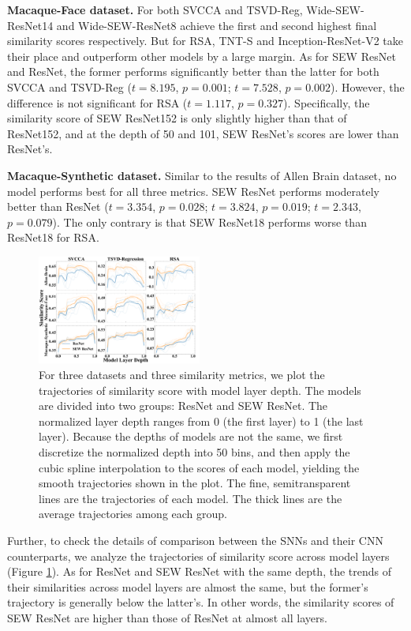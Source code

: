 \documentclass[letterpaper]{article} %
\begin{document}
\textbf{Macaque-Face dataset.} For both SVCCA and TSVD-Reg, Wide-SEW-ResNet14 and Wide-SEW-ResNet8 achieve the first and second highest final similarity scores respectively. But for RSA, TNT-S and Inception-ResNet-V2 take their place and outperform other models by a large margin. As for SEW ResNet and ResNet, the former performs significantly better than the latter for both SVCCA and TSVD-Reg ($t=8.195$, $p=0.001$; $t=7.528$, $p=0.002$). However, the difference is not significant for RSA ($t=1.117$, $p=0.327$). Specifically, the similarity score of SEW ResNet152 is only slightly higher than that of ResNet152, and at the depth of 50 and 101, SEW ResNet's scores are lower than ResNet's.

\textbf{Macaque-Synthetic dataset.} Similar to the results of Allen Brain dataset, no model performs best for all three metrics. SEW ResNet performs moderately better than ResNet ($t=3.354$, $p=0.028$; $t=3.824$, $p=0.019$; $t=2.343$, $p=0.079$). The only contrary is that SEW ResNet18 performs worse than ResNet18 for RSA.

\begin{figure}[t]
\centering
\includegraphics[width=0.48\textwidth]{figs/resnet_trajectory_compare.pdf}
\caption{For three datasets and three similarity metrics, we plot the trajectories of similarity score with model layer depth. The models are divided into two groups: ResNet and SEW ResNet. The normalized layer depth ranges from 0 (the first layer) to 1 (the last layer). Because the depths of models are not the same, we first discretize the normalized depth into 50 bins, and then apply the cubic spline interpolation to the scores of each model, yielding the smooth trajectories shown in the plot. The fine, semitransparent lines are the trajectories of each model. The thick lines are the average trajectories among each group.}
\label{Fig.resnet_trajectory_compare}
\end{figure}

Further, to check the details of comparison between the SNNs and their CNN counterparts, we analyze the trajectories of similarity score across model layers (Figure \ref{Fig.resnet_trajectory_compare}). As for ResNet and SEW ResNet with the same depth, the trends of their similarities across model layers are almost the same, but the former's trajectory is generally below the latter's. In other words, the similarity scores of SEW ResNet are higher than those of ResNet at almost all layers.
\end{document}
